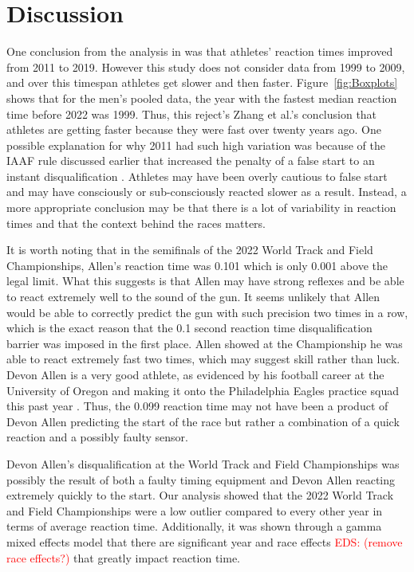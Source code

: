 \documentclass[12pt, letterpaper, titlepage]{article}
\newcommand{\eds}[1]{\textcolor{red}{EDS: (#1)}}
\begin{document}
\section{Discussion}\label{sec:Discussion}

One conclusion from the analysis in \citet{zhang2021correlation} was that 
athletes'
reaction times improved from 2011 to 2019.  However this study does not consider 
data from 1999 to 2009, and over this timespan athletes get slower and then
faster.  Figure~\ref{fig:Boxplots} shows that for the men's pooled data, the 
year with the fastest median reaction time before 2022 was 1999.  Thus, this 
reject's Zhang et al.'s conclusion that athletes are getting faster because they 
were 
fast over twenty years ago. One possible explanation for why 2011 had such
high variation was because of the IAAF rule discussed earlier that increased the
penalty of a false start to an instant disqualification \citep{iaaf2009falsestart}.
Athletes may have been overly cautious to false start and may have consciously
or sub-consciously reacted slower as a result.  Instead, a more appropriate 
conclusion may be that there is a lot of variability in reaction times and that
the context behind the races matters.

It is worth noting that in the semifinals of the 2022 World Track and
Field Championships, Allen's reaction time was 0.101 which is only 0.001 above
the legal limit. What this suggests is that Allen may have strong reflexes
and be able to react extremely well to the sound of the gun. It seems unlikely 
that Allen would be able to correctly predict the gun with such precision two 
times in a row, which is the exact reason that the 0.1 second reaction time 
disqualification barrier was
imposed in the first place. Allen showed at the Championship he was able to
react extremely fast two times, which may suggest skill rather than luck. Devon 
Allen is a very good athlete, as evidenced by his football career at the 
University of Oregon
and making it onto the Philadelphia Eagles practice squad this past year 
\citep{hurley2022eagles}. Thus, the 0.099 reaction time may not have been 
a product of Devon Allen predicting the start of the race but rather a 
combination of a quick reaction and a possibly faulty sensor.

Devon Allen's disqualification at the World Track and Field Championships was
possibly the result of both a faulty timing equipment and Devon Allen
reacting extremely quickly to the start.  Our analysis showed that
the 2022 World Track and Field Championships were a low outlier compared to
every other year in terms of average reaction time.  Additionally, it was shown
through a gamma mixed effects model that there are significant year and race
effects \eds{remove race effects?} that greatly impact reaction time.  
\end{document}
